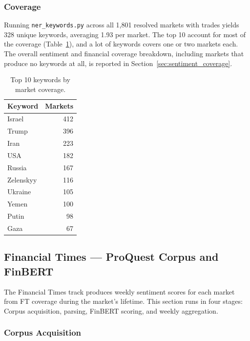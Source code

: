 \documentclass[11pt,a4paper]{article}
\begin{document}
\subsubsection*{Coverage}

Running \texttt{ner\_keywords.py} across all 1,801 resolved markets
with trades yields 328 unique keywords, averaging 1.93
per market. The top 10 account for most of the coverage
(Table~\ref{tab:top_keywords}), and a lot of  keywords
covers one or two markets each. The overall sentiment and financial
coverage breakdown, including markets that produce no keywords at
all, is reported in Section~\ref{sec:sentiment_coverage}.

\begin{table}[H]
\centering
\caption{Top 10 keywords by market coverage.}
\label{tab:top_keywords}
\small
\begin{tabularx}{0.6\textwidth}{X r}
\toprule
\textbf{Keyword} & \textbf{Markets} \\
\midrule
Israel    & 412 \\
Trump     & 396 \\
Iran      & 223 \\
USA       & 182 \\
Russia    & 167 \\
Zelenskyy & 116 \\
Ukraine   & 105 \\
Yemen     & 100 \\
Putin     &  98 \\
Gaza      &  67 \\
\bottomrule
\end{tabularx}
\end{table}




\subsection{Financial Times --- ProQuest Corpus and FinBERT}
\label{sec:ft_finbert}

The Financial Times track produces weekly sentiment scores for each
market from FT coverage during the market's lifetime. This section runs in four stages: Corpus acquisition, parsing, FinBERT scoring, and weekly aggregation.



\subsubsection*{Corpus Acquisition}
\label{sec:corpus_acquisition}
\end{document}
